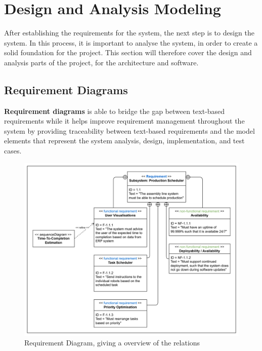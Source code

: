 
\section{Design and Analysis Modeling}
\label{sec:design-and-analysis-modelling}

After establishing the requirements for the system, the next step is to design the system. In this process, it is important to analyse the system, in order to create a solid foundation for the project.
This section will therefore cover the design and analysis parts of the project, for the architecture and software.





\subsection{Requirement Diagrams}

\textbf{Requirement diagrams} is able to bridge the gap between text-based requirements while it helps improve requirement management throughout the system by providing traceability between text-based requirements and the model elements that represent the system analysis, design, implementation, and test cases.

\begin{figure}[H]
    \centering
    \caption{\centering Requirement Diagram, giving a overview of the relations}
    \label{fig:requirements-diagram}
    \includegraphics[width=0.9\linewidth]{images/requirements diagram.png}
\end{figure}

